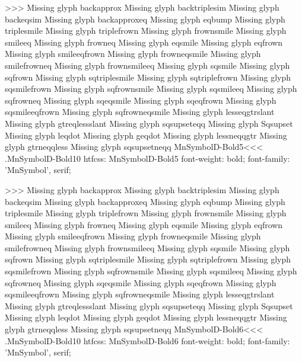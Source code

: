 >>>
Missing glyph	backapprox
Missing glyph	backtriplesim
Missing glyph	backeqsim
Missing glyph	backapproxeq
Missing glyph	eqbump
Missing glyph	triplesmile
Missing glyph	triplefrown
Missing glyph	frownsmile
Missing glyph	smileeq
Missing glyph	frowneq
Missing glyph	eqsmile
Missing glyph	eqfrown
Missing glyph	smileeqfrown
Missing glyph	frowneqsmile
Missing glyph	smilefrowneq
Missing glyph	frownsmileeq
Missing glyph	sqsmile
Missing glyph	sqfrown
Missing glyph	sqtriplesmile
Missing glyph	sqtriplefrown
Missing glyph	sqsmilefrown
Missing glyph	sqfrownsmile
Missing glyph	sqsmileeq
Missing glyph	sqfrowneq
Missing glyph	sqeqsmile
Missing glyph	sqeqfrown
Missing glyph	sqsmileeqfrown
Missing glyph	sqfrowneqsmile
Missing glyph	lesseqgtrslant
Missing glyph	gtreqlessslant
Missing glyph	sqsupseteqq
Missing glyph	Sqsupset
Missing glyph	leqdot
Missing glyph	geqdot
Missing glyph	lessneqqgtr
Missing glyph	gtrneqqless
Missing glyph	sqsupsetneqq
\<MnSymbolD-Bold5\><<<
.MnSymbolD-Bold10
htfcss:  MnSymbolD-Bold5  font-weight: bold; font-family: 'MnSymbol', serif;

>>>
Missing glyph	backapprox
Missing glyph	backtriplesim
Missing glyph	backeqsim
Missing glyph	backapproxeq
Missing glyph	eqbump
Missing glyph	triplesmile
Missing glyph	triplefrown
Missing glyph	frownsmile
Missing glyph	smileeq
Missing glyph	frowneq
Missing glyph	eqsmile
Missing glyph	eqfrown
Missing glyph	smileeqfrown
Missing glyph	frowneqsmile
Missing glyph	smilefrowneq
Missing glyph	frownsmileeq
Missing glyph	sqsmile
Missing glyph	sqfrown
Missing glyph	sqtriplesmile
Missing glyph	sqtriplefrown
Missing glyph	sqsmilefrown
Missing glyph	sqfrownsmile
Missing glyph	sqsmileeq
Missing glyph	sqfrowneq
Missing glyph	sqeqsmile
Missing glyph	sqeqfrown
Missing glyph	sqsmileeqfrown
Missing glyph	sqfrowneqsmile
Missing glyph	lesseqgtrslant
Missing glyph	gtreqlessslant
Missing glyph	sqsupseteqq
Missing glyph	Sqsupset
Missing glyph	leqdot
Missing glyph	geqdot
Missing glyph	lessneqqgtr
Missing glyph	gtrneqqless
Missing glyph	sqsupsetneqq
\<MnSymbolD-Bold6\><<<
.MnSymbolD-Bold10
htfcss:  MnSymbolD-Bold6  font-weight: bold; font-family: 'MnSymbol', serif;

